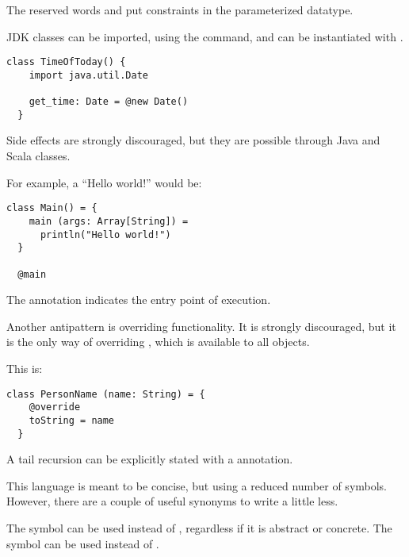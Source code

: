 The reserved words \ssubtype and \ssupertype put constraints in the parameterized datatype.

JDK classes can be imported, using the \simport command, and can be instantiated with \snew.

\begin{lstlisting}[label={lst:exampleJDKImport}]
  class TimeOfToday() {
    import java.util.Date

    get_time: Date = @new Date()
  }
\end{lstlisting}

Side effects are strongly discouraged, but they are possible through Java and Scala classes.

For example, a ``Hello world!'' would be:
\begin{lstlisting}[label={lst:exampleHelloWorld}]
  class Main() = {
    main (args: Array[String]) =
      println("Hello world!")
  }

  @main
\end{lstlisting}

The \smain annotation indicates the entry point of execution.

Another antipattern is overriding functionality.
It is strongly discouraged, but it is the only way of overriding , which is available to all objects.

This is:
\begin{lstlisting}[label={lst:exampleToString}]
  class PersonName (name: String) = {
    @override
    toString = name
  }
\end{lstlisting}

A tail recursion can be explicitly stated with a \stailrec annotation.

This language is meant to be concise, but using a reduced number of symbols.
However, there are a couple of useful synonyms to write a little less.

The symbol \sasterisk can be used instead of \sclass, regardless if it is abstract or concrete.
The symbol \splus can be used instead of \simport.

